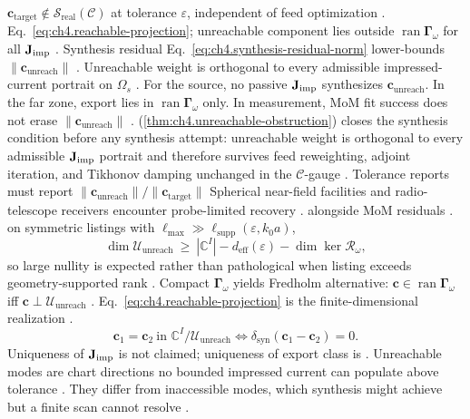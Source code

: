 \(\mathbf{c}_{\mathrm{target}}\notin\mathcal{S}_{\mathrm{real}}(\mathcal{C})\) at tolerance \(\varepsilon\), independent of feed optimization
\cite{stratton1941}.
Eq.~\eqref{eq:ch4.reachable-projection}; unreachable component lies outside \(\operatorname{ran}\boldsymbol{\Gamma}_\omega\) for all \(\mathbf{J}_{\mathrm{imp}}\)
\cite{stratton1941}. Synthesis residual Eq.~\eqref{eq:ch4.synthesis-residual-norm} lower-bounds \(\|\mathbf{c}_{\mathrm{unreach}}\|\)
\cite{devaney2004}.
Unreachable weight is orthogonal to every admissible impressed-current portrait on $\Omega_{s}$ \cite{stratton1941}. For the source, no passive $\mathbf{J}_{\mathrm{imp}}$ synthesizes $\mathbf{c}_{\mathrm{unreach}}$. In the far zone, export lies in $\operatorname{ran}\boldsymbol{\Gamma}_\omega$ only. In measurement, MoM fit success does not erase $\|\mathbf{c}_{\mathrm{unreach}}\|$ \cite{devaney2004}.
(\ref{thm:ch4.unreachable-obstruction}) closes the synthesis condition before any synthesis attempt: unreachable weight is orthogonal to every admissible
\(\mathbf{J}_{\mathrm{imp}}\) portrait and therefore survives feed reweighting, adjoint iteration, and Tikhonov damping unchanged in the \(\mathcal{C}\)-gauge
\cite{stratton1941}. Tolerance reports must report \(\|\mathbf{c}_{\mathrm{unreach}}\|/\|\mathbf{c}_{\mathrm{target}}\|\)
Spherical near-field facilities and radio-telescope receivers encounter probe-limited recovery \cite{hansen1988}.
alongside MoM residuals \cite{hansen1988}.
on symmetric listings with \(\ell_{\max}\gg\ell_{\mathrm{supp}}(\varepsilon,k_{0}a)\),
\begin{equation}
\label{eq:ch4.unreach-dim-bound-symmetric}
\dim\mathcal{U}_{\mathrm{unreach}}\ \ge\ |\mathbb{C}^{I}|-d_{\mathrm{eff}}(\varepsilon)-\dim\ker\mathcal{R}_\omega,
\end{equation}
so large nullity is expected rather than pathological when listing exceeds geometry-supported rank \cite{hansen1988}.
Compact \(\boldsymbol{\Gamma}_\omega\) yields Fredholm alternative: \(\mathbf{c}\in\operatorname{ran}\boldsymbol{\Gamma}_\omega\) iff
\(\mathbf{c}\perp\mathcal{U}_{\mathrm{unreach}}\) \cite{harrington2001}. Eq.~\eqref{eq:ch4.reachable-projection} is the finite-dimensional
realization \cite{devaney2004}.
\begin{equation}
\label{eq:ch4.quotient-synthesis}
\mathbf{c}_{1}=\mathbf{c}_{2}\ \text{in }\mathbb{C}^{I}/\mathcal{U}_{\mathrm{unreach}}
\iff
\delta_{\mathrm{syn}}(\mathbf{c}_{1}-\mathbf{c}_{2})=0.
\end{equation}
Uniqueness of \(\mathbf{J}_{\mathrm{imp}}\) is not claimed; uniqueness of export class is \cite{harrington2001}.
Unreachable modes are chart directions no bounded impressed current can populate above tolerance \cite{devaney2004}. They differ from inaccessible modes, which synthesis might achieve but a finite scan cannot resolve \cite{stratton1941}.
